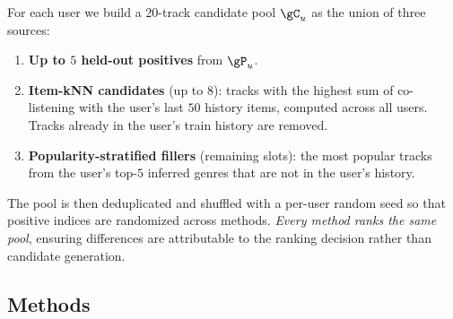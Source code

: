 For each user we build a $20$-track candidate pool $\gC_u$ as the union of three sources:
\begin{enumerate}[leftmargin=*,itemsep=0pt,topsep=0pt]
    \item \textbf{Up to $5$ held-out positives} from $\gP_u$.
    \item \textbf{Item-kNN candidates} (up to $8$): tracks with the highest sum of co-listening with the user's last $50$ history items, computed across all \lastfm users. Tracks already in the user's train history are removed.
    \item \textbf{Popularity-stratified fillers} (remaining slots): the most popular \spotcat tracks from the user's top-$5$ inferred genres that are not in the user's history.
\end{enumerate}
The pool is then deduplicated and shuffled with a per-user random seed so that positive indices are randomized across methods. \emph{Every method ranks the same pool}, ensuring differences are attributable to the ranking decision rather than candidate generation.

\subsection{Methods}
\label{sec:methods}


